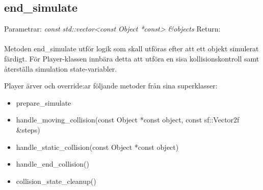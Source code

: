 \documentclass{TDP003mall}
\begin{document}
\subsection{end\_simulate}
Parametrar: \textit{const std::vector<const Object *const> \&objects}
Return:
\\\\
Metoden end\_simulate utför logik som skall utföras efter att ett objekt simulerat färdigt. För Player-klassen innbära detta att utföra en sisa kollisionskontroll samt återställa simulation state-variabler.

Player ärver och override:ar följande metoder från sina superklasser:
\begin{itemize}
\item prepare\_simulate
\item handle\_moving\_collision(const Object *const object, const sf::Vector2f \&steps)
\item handle\_static\_collision(const Object *const object)
\item handle\_end\_collision()
\item collision\_state\_cleanup()
\end{itemize}
\end{document}
